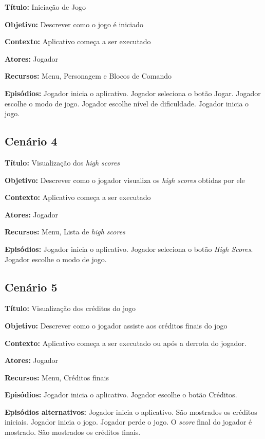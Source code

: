\textbf{Título:} Iniciação de Jogo

\textbf{Objetivo:} Descrever como o jogo é iniciado

\textbf{Contexto:} Aplicativo começa a ser executado 

\textbf{Atores:} Jogador

\textbf{Recursos:} Menu, Personagem e Blocos de Comando

\textbf{Episódios:} Jogador inicia o aplicativo. Jogador seleciona o botão Jogar. Jogador escolhe o modo de jogo. Jogador escolhe nível de dificuldade. Jogador inicia o jogo.

\subsection{Cenário 4}

\textbf{Título:} Visualização dos \textit{high scores}

\textbf{Objetivo:} Descrever como o jogador visualiza os \textit{high scores} obtidas por ele

\textbf{Contexto:} Aplicativo começa a ser executado

\textbf{Atores:} Jogador

\textbf{Recursos:} Menu, Lista de \textit{high scores}

\textbf{Episódios:} Jogador inicia o aplicativo. Jogador seleciona o botão \textit{High Scores}. Jogador escolhe o modo de jogo.

\subsection{Cenário 5}

\textbf{Título:} Visualização dos créditos do jogo

\textbf{Objetivo:} Descrever como o jogador assiste aos créditos finais do jogo

\textbf{Contexto:} Aplicativo começa a ser executado ou após a derrota do jogador.

\textbf{Atores:} Jogador

\textbf{Recursos:} Menu, Créditos finais

\textbf{Episódios:} Jogador inicia o aplicativo. Jogador escolhe o botão Créditos.

\textbf{Episódios alternativos:} Jogador inicia o aplicativo. São mostrados os créditos iniciais. Jogador inicia o jogo. Jogador perde o jogo. O \textit{score} final do jogador é mostrado. São mostrados os créditos finais.

